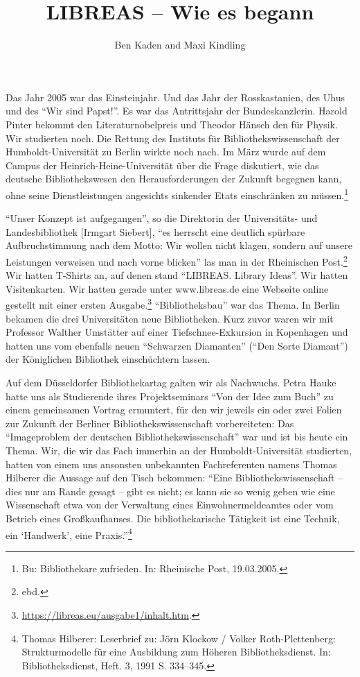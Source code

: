 
\title{LIBREAS -- Wie es begann} 
\author{Ben Kaden and Maxi Kindling}

Das Jahr 2005 war das Einsteinjahr. Und das Jahr der Rosskastanien, des
Uhus und des \enquote{Wir sind Papst!}. Es war das Antrittsjahr der
Bundeskanzlerin. Harold Pinter bekommt den Literaturnobelpreis und
Theodor Hänsch den für Physik. Wir studierten noch. Die Rettung des
Instituts für Bibliothekswissenschaft der Humboldt-Universität zu Berlin
wirkte noch nach. Im März wurde auf dem Campus der
Heinrich-Heine-Universität über die Frage diskutiert, wie das deutsche
Bibliothekswesen den Herausforderungen der Zukunft begegnen kann, ohne
seine Dienstleistungen angesichts sinkender Etats einschränken zu
müssen.\footnote{Bu: Bibliothekare zufrieden. In: Rheinische Post,
  19.03.2005.}

\enquote{Unser Konzept ist aufgegangen}, so die Direktorin der
Universitäts- und Landesbibliothek {[}Irmgart Siebert{]}, \enquote{es
herrscht eine deutlich spürbare Aufbruchstimmung nach dem Motto: Wir
wollen nicht klagen, sondern auf unsere Leistungen verweisen und nach
vorne blicken} las man in der Rheinischen Post.\footnote{ebd.} Wir
hatten T-Shirts an, auf denen stand \enquote{LIBREAS. Library Ideas}.
Wir hatten Visitenkarten. Wir hatten gerade unter www.libreas.de eine
Webseite online gestellt mit einer ersten Ausgabe.\footnote{\url{https://libreas.eu/ausgabe1/inhalt.htm}.}
\enquote{Bibliotheksbau} war das Thema. In Berlin bekamen die drei
Universitäten neue Bibliotheken. Kurz zuvor waren wir mit Professor
Walther Umstätter auf einer Tiefschnee-Exkursion in Kopenhagen und
hatten uns vom ebenfalls neuen \enquote{Schwarzen Diamanten}
(\enquote{Den Sorte Diamant}) der Königlichen Bibliothek einschüchtern
lassen.

Auf dem Düsseldorfer Bibliothekartag galten wir als Nachwuchs. Petra
Hauke hatte uns als Studierende ihres Projektseminars \enquote{Von der
Idee zum Buch} zu einem gemeinsamen Vortrag ermuntert, für den wir
jeweils ein oder zwei Folien zur Zukunft der Berliner
Bibliothekswissenschaft vorbereiteten: Das \enquote{Imageproblem der
deutschen Bibliothekswissenschaft} war und ist bis heute ein Thema. Wir,
die wir das Fach immerhin an der Humboldt-Universität studierten, hatten
von einem uns ansonsten unbekannten Fachreferenten namens Thomas
Hilberer die Aussage auf den Tisch bekommen: \enquote{Eine
Bibliothekswissenschaft -- dies nur am Rande gesagt -- gibt es nicht; es
kann sie so wenig geben wie eine Wissenschaft etwa von der Verwaltung
eines Einwohnermeldeamtes oder vom Betrieb eines Großkaufhauses. Die
bibliothekarische Tätigkeit ist eine Technik, ein \enquote*{Handwerk},
eine Praxis.}\footnote{Thomas Hilberer: Leserbrief zu: Jörn Klockow /
  Volker Roth-Plettenberg: Strukturmodelle für eine Ausbildung zum
  Höheren Bibliotheksdienst. In: Bibliotheksdienst, Heft. 3, 1991 S.
  334--345.}

